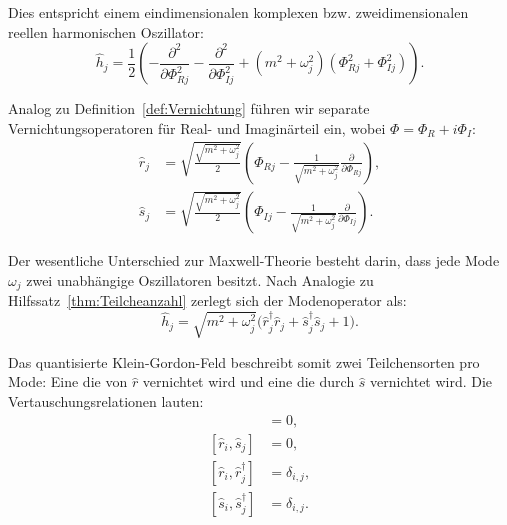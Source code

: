 \documentclass[11pt,a4paper,leqno]{report}
\numberwithin{equation}{chapter}
\begin{document}
\noindent
Dies entspricht einem eindimensionalen komplexen bzw. zweidimensionalen reellen harmonischen Oszillator:
\begin{equation}\label{eq:KG-hj-reell}
	\hat{h}_j = \frac{1}{2}\left(-\frac{\partial^2}{\partial\Phi_{Rj}^2} - \frac{\partial^2}{\partial\Phi_{Ij}^2} + (m^2 + \omega_j^2)(\Phi_{Rj}^2 + \Phi_{Ij}^2)\right).
\end{equation}

\noindent
Analog zu Definition~\ref{def:Vernichtung} führen wir separate Vernichtungsoperatoren für Real- und Imaginärteil ein, wobei $\Phi = \Phi_R + i\Phi_I$:
\begin{align}
	\hat{r}_j &= \sqrt{\frac{\sqrt{m^2 + \omega_j^2}}{2}}\left(\Phi_{Rj} - \frac{1}{\sqrt{m^2 + \omega_j^2}}\frac{\partial}{\partial\Phi_{Rj}}\right), \label{eq:KG-rj} \\
	\hat{s}_j &= \sqrt{\frac{\sqrt{m^2 + \omega_j^2}}{2}}\left(\Phi_{Ij} - \frac{1}{\sqrt{m^2 + \omega_j^2}}\frac{\partial}{\partial\Phi_{Ij}}\right). \label{eq:KG-sj}
\end{align}

\noindent
Der wesentliche Unterschied zur Maxwell-Theorie besteht darin, dass jede Mode $\omega_j$ zwei unabhängige Oszillatoren besitzt. Nach Analogie zu Hilfssatz~\ref{thm:Teilcheanzahl} zerlegt sich der Modenoperator als:
\begin{equation}\label{eq:KG-hj-teilchen}
	\hat{h}_j = \sqrt{m^2 + \omega_j^2}\bigl(\hat{r}_j^\dagger\hat{r}_j + \hat{s}_j^\dagger\hat{s}_j + 1\bigr).
\end{equation}

\noindent
Das quantisierte Klein-Gordon-Feld beschreibt somit zwei Teilchensorten pro Mode: Eine die von $\hat{r}$ vernichtet wird und eine die durch $\hat{s}$ vernichtet wird. Die Vertauschungsrelationen lauten:
\begin{align}
	[\hat{r}_i, \hat{s}_j^\dagger] &= 0, \label{eq:KG-rs-comm1} \\
	[\hat{r}_i, \hat{s}_j] &= 0, \label{eq:KG-rs-comm2} \\
	[\hat{r}_i, \hat{r}_j^\dagger] &= \delta_{i,j}, \label{eq:KG-r-comm} \\
	[\hat{s}_i, \hat{s}_j^\dagger] &= \delta_{i,j}. \label{eq:KG-s-comm}
\end{align}
\end{document}
